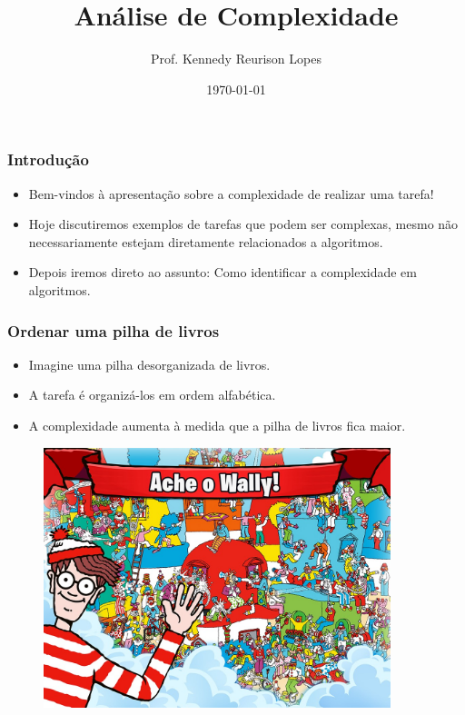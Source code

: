 \documentclass[10pt]{beamer}
\title{Análise de Complexidade}
\author{Prof. Kennedy Reurison Lopes}
\date{\today}
\begin{document}
\frame{\titlepage}

\begin{frame}
    \frametitle{Introdução}

    \begin{itemize}
        \item Bem-vindos à apresentação sobre a complexidade de realizar uma tarefa!
        \item Hoje discutiremos exemplos de tarefas que podem ser complexas, mesmo não necessariamente estejam diretamente relacionados a algoritmos.
        \item Depois iremos direto ao assunto: Como identificar a complexidade em algoritmos.
    \end{itemize}
\end{frame}

\begin{frame}
    \frametitle{Ordenar uma pilha de livros}
    \begin{itemize}
        \item Imagine uma pilha desorganizada de livros.
        \item A tarefa é organizá-los em ordem alfabética.
        \item A complexidade aumenta à medida que a pilha de livros fica maior.
    \end{itemize}
\end{frame}

\begin{frame}
    \begin{figure}[htb]
        \centering
        \includegraphics[width=0.9\textwidth]{wally.jpg}
        \label{fig:wally2}
    \end{figure}
\end{frame}
\end{document}
